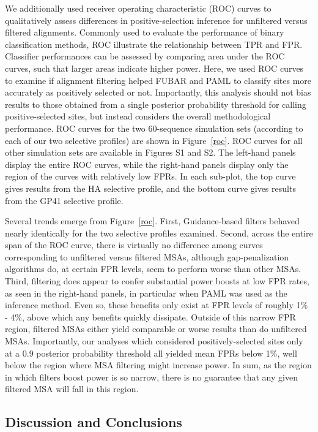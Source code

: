\documentclass[11pt]{article}
\begin{document}
We additionally used receiver operating characteristic (ROC) curves to qualitatively assess differences in positive-selection inference for unfiltered versus filtered alignments. Commonly used to evaluate the performance of binary classification methods, ROC illustrate the relationship between TPR and FPR. Classifier performances can be assessed by comparing area under the ROC curves, such that larger areas indicate higher power. Here, we used ROC curves to examine if alignment filtering helped FUBAR and PAML to classify sites more accurately as positively selected or not. Importantly, this analysis should not bias results to those obtained from a single posterior probability threshold for calling positive-selected sites, but instead considers the overall methodological performance. ROC curves for the two 60-sequence simulation sets (according to each of our two selective profiles) are shown in Figure~\ref{roc}. ROC curves for all other simulation sets are available in Figures S1 and S2. The left-hand panels display the entire ROC curves, while the right-hand panels display only the region of the curves with relatively low FPRs. In each sub-plot, the top curve gives results from the HA selective profile, and the bottom curve gives results from the GP41 selective profile. 

Several trends emerge from Figure~\ref{roc}. First, Guidance-based filters behaved nearly identically for the two selective profiles examined. Second, across the entire span of the ROC curve, there is virtually no difference among curves corresponding to unfiltered versus filtered MSAs, although gap-penalization algorithms do, at certain FPR levels, seem to perform worse than other MSAs. Third, filtering does appear to confer substantial power boosts at low FPR rates, as seen in the right-hand panels, in particular when PAML was used as the inference method. Even so, these benefits only exist at FPR levels of roughly 1\% - 4\%, above which any benefits quickly dissipate. Outside of this narrow FPR region, filtered MSAs either yield comparable or worse results than do unfiltered MSAs. Importantly, our analyses which considered positively-selected sites only at a $0.9$ posterior probability threshold all yielded mean FPRs below 1\%, well below the region where MSA filtering might increase power. In sum, as the region in which filters boost power is so narrow, there is no guarantee that any given filtered MSA will fall in this region.

\subsection*{Discussion and Conclusions}
\end{document}
